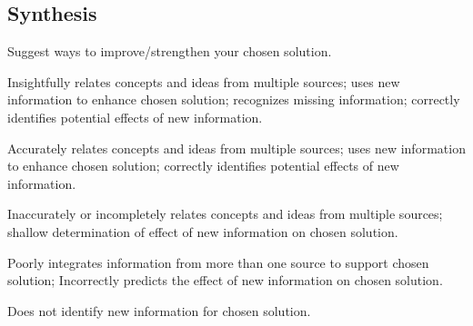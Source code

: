 \subsection{Synthesis}

Suggest ways to improve/strengthen your chosen solution.

\begin{enumerate*}
	\item Insightfully relates concepts and ideas from multiple sources; uses new information to enhance chosen solution; recognizes missing information; correctly identifies potential effects of new information.	
	\item Accurately relates concepts and ideas from multiple sources; uses new information to enhance chosen solution; correctly identifies potential effects of new information.	
	\item Inaccurately or incompletely relates concepts and ideas from multiple sources; shallow determination of effect of new information on chosen solution.	
	\item Poorly integrates information from more than one source to support chosen solution; Incorrectly predicts the effect of new information on chosen solution.	
	\item Does not identify new information for chosen solution.	
\end{enumerate*}






